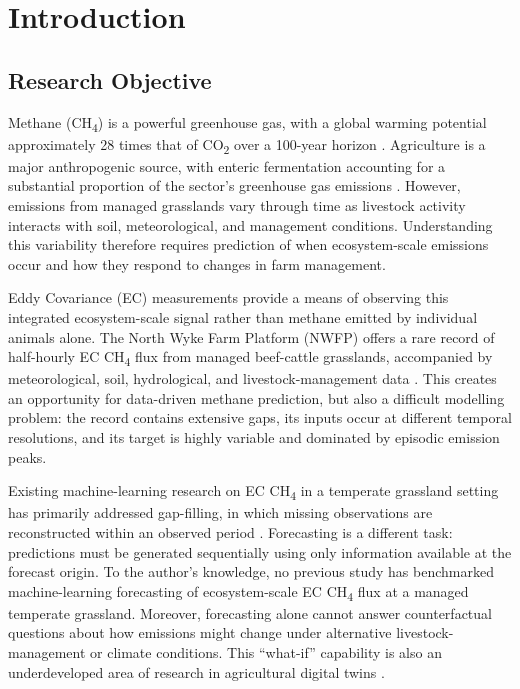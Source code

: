 \chapter{Introduction} \label{Chap1}

\section{Research Objective}

Methane (CH\textsubscript{4}) is a powerful greenhouse gas, with a global
warming potential approximately 28 times that of CO\textsubscript{2} over a
100-year horizon \cite{ipcc2021}. Agriculture is a major anthropogenic source,
with enteric fermentation accounting for a substantial proportion of the
sector's greenhouse gas emissions \cite{fao2023,eea2024}. However, emissions
from managed grasslands vary through time as livestock activity interacts with
soil, meteorological, and management conditions. Understanding this variability
therefore requires prediction of when ecosystem-scale emissions occur and how they 
respond to changes in farm management.

Eddy Covariance (EC) measurements provide a means of observing this integrated
ecosystem-scale signal rather than methane emitted by individual animals alone.
The North Wyke Farm Platform (NWFP) offers a rare record of half-hourly EC
CH\textsubscript{4} flux from managed beef-cattle grasslands, accompanied by
meteorological, soil, hydrological, and livestock-management data
\cite{hawkins2025,cardenas2022}. This creates an opportunity for
data-driven methane prediction, but also a difficult modelling problem: the
record contains extensive gaps, its inputs occur at different temporal
resolutions, and its target is highly variable and dominated by episodic
emission peaks.

Existing machine-learning research on EC CH\textsubscript{4} in a temperate grassland 
setting has primarily addressed gap-filling, in which missing observations are reconstructed within an
observed period \cite{irvin2021,zhu2023a}. Forecasting is a different task:
predictions must be generated sequentially using only information available at
the forecast origin. To the author's knowledge, no previous study has
benchmarked machine-learning forecasting of ecosystem-scale EC
CH\textsubscript{4} flux at a managed temperate grassland. Moreover, forecasting
alone cannot answer counterfactual questions about how emissions might change
under alternative livestock-management or climate conditions. This
``what-if'' capability is also an underdeveloped area of research in agricultural digital twins \cite{purcell2023state,fakeye2024}.

